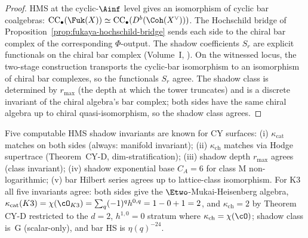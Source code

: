 \begin{proof}
HMS at the cyclic-$\Ainf$ level gives an isomorphism of cyclic
bar coalgebras:
$\mathrm{CC}_\bullet(\Fuk(X)) \simeq
 \mathrm{CC}_\bullet(D^b(\Coh(X^\vee)))$. The Hochschild bridge
of Proposition~\ref{prop:fukaya-hochschild-bridge} sends each
side to the chiral bar complex of the corresponding $\Phi$-output.
The shadow coefficients $S_r$ are explicit functionals on the
chiral bar complex (Volume~I,
\cite{VolI}). On the witnessed
locus, the two-stage construction transports the cyclic-bar
isomorphism to an isomorphism of chiral bar complexes, so the
functionals $S_r$ agree. The shadow class is determined by
$r_{\max}$ (the depth at which the tower truncates) and is a
discrete invariant of the chiral algebra's bar complex; both
sides have the same chiral algebra up to chiral
quasi-isomorphism, so the shadow class agrees.
\end{proof}

\begin{remark}
\label{rem:hms-numerical-invariants}
Five computable HMS shadow invariants are known for CY surfaces:
(i) $\kappa_{\mathrm{cat}}$ matches on both sides (always:
manifold invariant);
(ii) $\kappa_{\mathrm{ch}}$ matches via Hodge supertrace
(Theorem~CY-D, dim-stratification);
(iii) shadow depth $r_{\max}$ agrees (class invariant);
(iv) shadow exponential base $C_A = 6$ for class M
non-logarithmic;
(v) bar Hilbert series agrees up to lattice-class isomorphism.
For K3 all five invariants agree: both sides give the
$\Etwo$-Mukai-Heisenberg algebra, $\kappa_{\mathrm{cat}}(K3) =
\chi(\cO_{K3}) = \sum_q (-1)^q h^{0,q} = 1 - 0 + 1 = 2$, and
$\kappa_{\mathrm{ch}} = 2$ by Theorem CY-D restricted to the
$d = 2$, $h^{1,0} = 0$ stratum where
$\kappa_{\mathrm{ch}} = \chi(\cO)$; shadow class is~G
(scalar-only), and bar HS is $\eta(q)^{-24}$.
\end{remark}

